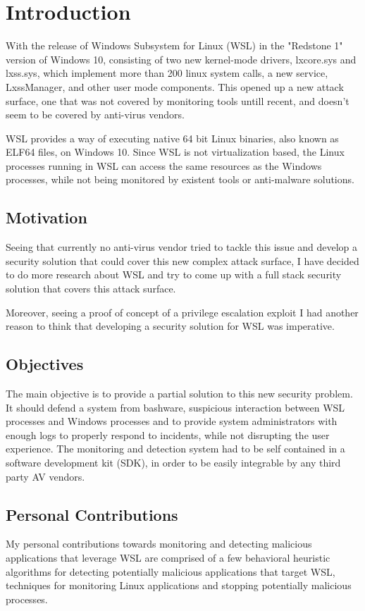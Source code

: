 \chapter{Introduction}
    With the release of Windows Subsystem for Linux (WSL) in the "Redstone 1" version of Windows 10, consisting of two new kernel-mode drivers,
    lxcore.sys and lxss.sys, which implement more than  200 linux system calls, a new service, LxssManager, and other user mode components.
    This opened up a new attack surface, one that was not covered by monitoring tools untill recent, and doesn't seem to be covered by
    anti-virus vendors.

    WSL provides a way of executing native 64 bit Linux binaries, also known as ELF64 files, on Windows 10. Since WSL is not virtualization
    based, the Linux processes running in WSL can access the same resources as the Windows processes, while not being monitored by existent
    tools or anti-malware solutions.

    \section{Motivation}
        Seeing that currently no anti-virus vendor tried to tackle this issue and develop a security solution that could cover this new
        complex attack surface, I have decided to do more research about WSL and try to come up with a full stack security solution that covers
        this attack surface.
        
        Moreover, seeing a proof of concept of a privilege escalation exploit I had another reason to think that developing a security solution
        for WSL was imperative.

    \section{Objectives}
        The main objective is to provide a partial solution to this new security problem. It should defend a system from bashware,
        suspicious interaction between WSL processes and Windows processes and to provide system administrators with enough logs to properly
        respond to incidents, while not disrupting the user experience. The monitoring and detection system had to be self contained in
        a software development kit (SDK), in order to be easily integrable by any third party AV vendors.

    \section{Personal Contributions}
        My personal contributions towards monitoring and detecting malicious applications that leverage WSL are comprised of a few behavioral
        heuristic algorithms for detecting potentially malicious applications that target WSL, techniques for monitoring Linux applications
        and stopping potentially malicious processes.

